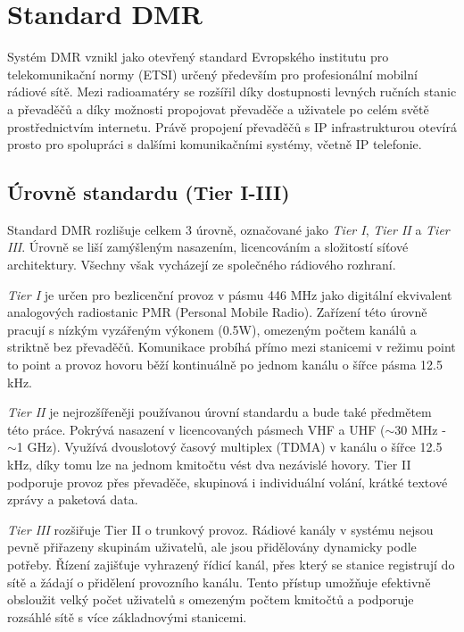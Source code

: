\documentclass[twoside]{ctuthesis}
\begin{document}
\chapter{Standard DMR}

Systém DMR vznikl jako otevřený standard Evropského institutu pro telekomunikační normy (ETSI) určený především pro profesionální mobilní rádiové sítě.
Mezi radioamatéry se rozšířil díky dostupnosti levných ručních stanic a převaděčů a díky možnosti propojovat převaděče a uživatele po celém světě prostřednictvím internetu.
Právě propojení převaděčů s IP infrastrukturou otevírá prosto pro spolupráci s dalšími komunikačními systémy, včetně IP telefonie.

\section{Úrovně standardu (Tier I-III)}
Standard DMR rozlišuje celkem 3 úrovně, označované jako \textit{Tier I}, \textit{Tier II} a \textit{Tier III}.
Úrovně se liší zamýšleným nasazením, licencováním a složitostí síťové architektury.
Všechny však vycházejí ze společného rádiového rozhraní.


\textit{Tier I} je určen pro bezlicenční provoz v pásmu 446 MHz jako digitální ekvivalent analogových radiostanic PMR (Personal Mobile Radio).
Zařízení této úrovně pracují s nízkým vyzářeným výkonem (0.5W), omezeným počtem kanálů a striktně bez převaděčů.
Komunikace probíhá přímo mezi stanicemi v režimu point to point a provoz hovoru běží kontinuálně po jednom kanálu o šířce pásma 12.5 kHz. 


\textit{Tier II} je nejrozšířeněji používanou úrovní standardu a bude také předmětem této práce. Pokrývá nasazení v licencovaných pásmech VHF a UHF ($\sim$30 MHz - $\sim$1 GHz).
Využívá dvouslotový časový multiplex (TDMA) v kanálu o šířce 12.5 kHz, díky tomu lze na jednom kmitočtu vést dva nezávislé hovory.  Tier II podporuje provoz přes převaděče,
skupinová i individuální volání, krátké textové zprávy a paketová data.


\textit{Tier III} rozšiřuje Tier II o trunkový provoz. Rádiové kanály v systému nejsou pevně přiřazeny skupinám uživatelů, ale jsou přidělovány dynamicky podle potřeby.
Řízení zajišťuje vyhrazený řídicí kanál, přes který se stanice registrují do sítě a žádají o přidělení provozního kanálu.
Tento přístup umožňuje efektivně obsloužit velký počet uživatelů s omezeným počtem kmitočtů a podporuje rozsáhlé sítě s více základnovými stanicemi.
\end{document}
